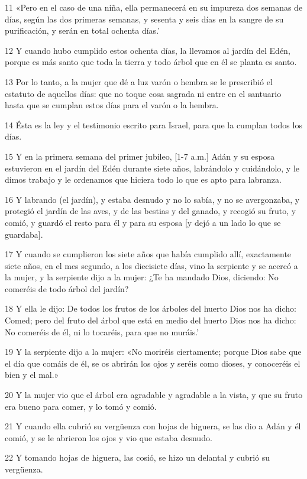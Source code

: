 \par 11 «Pero en el caso de una niña, ella permanecerá en su impureza dos semanas de días, según las dos primeras semanas, y sesenta y seis días en la sangre de su purificación, y serán en total ochenta días.'
\par 12 Y cuando hubo cumplido estos ochenta días, la llevamos al jardín del Edén, porque es más santo que toda la tierra y todo árbol que en él se planta es santo.
\par 13 Por lo tanto, a la mujer que dé a luz varón o hembra se le prescribió el estatuto de aquellos días: que no toque cosa sagrada ni entre en el santuario hasta que se cumplan estos días para el varón o la hembra.
\par 14 Ésta es la ley y el testimonio escrito para Israel, para que la cumplan todos los días.
\par 15 Y en la primera semana del primer jubileo, [1-7 a.m.] Adán y su esposa estuvieron en el jardín del Edén durante siete años, labrándolo y cuidándolo, y le dimos trabajo y le ordenamos que hiciera todo lo que es apto para labranza.
\par 16 Y labrando (el jardín), y estaba desnudo y no lo sabía, y no se avergonzaba, y protegió el jardín de las aves, y de las bestias y del ganado, y recogió su fruto, y comió, y guardó el resto para él y para su esposa [y dejó a un lado lo que se guardaba].
\par 17 Y cuando se cumplieron los siete años que había cumplido allí, exactamente siete años, en el mes segundo, a los diecisiete días, vino la serpiente y se acercó a la mujer, y la serpiente dijo a la mujer: ¿Te ha mandado Dios, diciendo: No comeréis de todo árbol del jardín?
\par 18 Y ella le dijo: De todos los frutos de los árboles del huerto Dios nos ha dicho: Comed; pero del fruto del árbol que está en medio del huerto Dios nos ha dicho: No comeréis de él, ni lo tocaréis, para que no muráis.'
\par 19 Y la serpiente dijo a la mujer: «No moriréis ciertamente; porque Dios sabe que el día que comáis de él, se os abrirán los ojos y seréis como dioses, y conoceréis el bien y el mal.»
\par 20 Y la mujer vio que el árbol era agradable y agradable a la vista, y que su fruto era bueno para comer, y lo tomó y comió.
\par 21 Y cuando ella cubrió su vergüenza con hojas de higuera, se las dio a Adán y él comió, y se le abrieron los ojos y vio que estaba desnudo.
\par 22 Y tomando hojas de higuera, las cosió, se hizo un delantal y cubrió su vergüenza.
